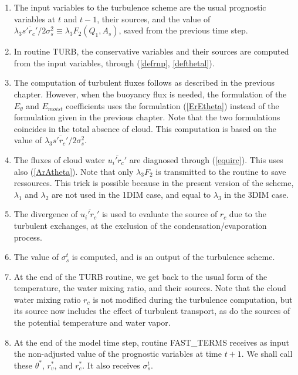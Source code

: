 \begin{enumerate}

\item The input variables to the turbulence scheme are the usual prognostic
variables at $t$ and $t-1$, their sources, and the value of $\lambda_3
\overline{s'r_c'} / 2 \sigma_s^2 \equiv \lambda_3 F_2(Q_1,A_s)$,
saved from the previous time step.

\item
In routine TURB, the conservative variables and their sources are computed
from the input variables, through (\ref{defrnp}, \ref{defthetal}).

\item
The computation of turbulent fluxes follows as described in the previous
chapter. However, when the buoyancy flux is needed, the formulation of the
$E_{\theta}$ and $E_{moist}$ coefficients uses the formulation (\ref{ErEtheta})
instead of the formulation given in the previous chapter. Note that the
two formulations coincides in the total absence of cloud. This computation
is based on the value of $\lambda_3 \overline{s'r_c'}/2\sigma_s^2$.

\item
The fluxes of cloud water $\overline{u_i'r_c'}$ are diagnosed
through (\ref{equirc}).
This uses also (\ref{ArAtheta}). Note that only $\lambda_3 F_2$ is transmitted
to the routine to save ressources. This trick is possible because in the
present version of the scheme, $\lambda_1$ and $\lambda_2$ are not used
in the 1DIM case, and equal to $\lambda_3$ in the 3DIM case.

\item
The divergence of $\overline{u_i'r_c'}$ is used to evaluate the source
of $r_c$ due to the
turbulent exchanges, at the exclusion of the condensation/evaporation process.

\item The value of $\sigma_s^t$ is computed, and is an
output of the turbulence scheme.

\item
At the end of the TURB routine, we get back to the usual form of the
temperature, the water mixing ratio, and their sources. Note that the
cloud water mixing ratio $r_c$ is not modified during the turbulence
computation, but its source now includes the effect of turbulent transport,
as do the sources of the potential temperature and water vapor.


\item At the end of the model time step, routine FAST\_TERMS receives
as input the non-adjusted value of the prognostic variables at time $t+1$.
We shall call
these $\theta^*$, $r_v^*$, and $r_c^*$. It also receives $\sigma_s^t$.


\end{enumerate}
